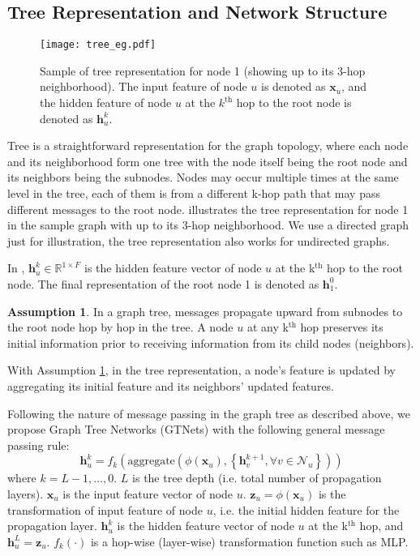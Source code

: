 \documentclass[lettersize,journal]{IEEEtran}
\theoremstyle{plain}
\theoremstyle{definition}
\newtheorem{assumption}[theorem]{Assumption}
\theoremstyle{remark}
\begin{document}
\subsection{Tree Representation and Network Structure} 
\label{GTNet}

\begin{figure}[ht]
	\begin{center}
		\texttt{[image: tree\_eg.pdf]}
		\caption{Sample of tree representation for node 1 (showing up to its 3-hop neighborhood). The input feature of node $u$ is denoted as $\bm{x}_u$, and the hidden feature of node $u$ at the $k^{\text{th}}$ hop to the root node is denoted as $\bm{h}_u^k$.}
		\label{fig:tree}
	\end{center}
\end{figure}

Tree is a straightforward representation for the graph topology, where each node and its neighborhood form one tree with the node itself being the root node and its neighbors being the subnodes. Nodes may occur multiple times at the same level in the tree, each of them is from a different k-hop path that may pass different messages to the root node.  illustrates the tree representation for node 1 in the sample graph with up to its 3-hop neighborhood. We use a directed graph just for illustration, the tree representation also works for undirected graphs.

In , $\bm{h}_u^k \in \mathbb{R}^{1 \times F}$ is the hidden feature vector of node $u$ at the k$^\text{th}$ hop to the root node. The final representation of the root node 1 is denoted as $\bm{h}_1^{0}$.

\begin{assumption}
	\label{assumption}
	In a graph tree, messages propagate upward from subnodes to the root node hop by hop in the tree. A node $u$ at any k$^\text{th}$ hop preserves its initial information prior to receiving information from its child nodes (neighbors).
\end{assumption}
With Assumption \ref{assumption}, in the tree representation, a node's feature is updated by aggregating its initial feature and its neighbors' updated features.

Following the nature of message passing in the graph tree as described above, we propose Graph Tree Networks (GTNets) with the following general message passing rule:
\begin{equation}
	\label{eqn:propagation_rule}
	\bm{h}_u^k = f_k\left(\text{aggregate}\left(\phi \left(\bm{x}_u \right), \left\{\bm{h}_v^{k+1}, \forall v \in \mathcal{N}_u \right\}\right)\right)
\end{equation}
where $k=L-1, \ldots, 0$. $L$ is the tree depth (i.e. total number of propagation layers). $\bm{x}_u$ is the input feature vector of node $u$. $\bm{z}_u = \phi(\bm{x}_u)$ is the transformation of input feature of node $u$, i.e. the initial hidden feature for the propagation layer. $\bm{h}_u^k$ is the hidden feature vector of node $u$ at the k$^\text{th}$ hop, and $\bm{h}_u^L = \bm{z}_u$. $f_k(\cdot)$ is a hop-wise (layer-wise) transformation function such as MLP.
\end{document}
